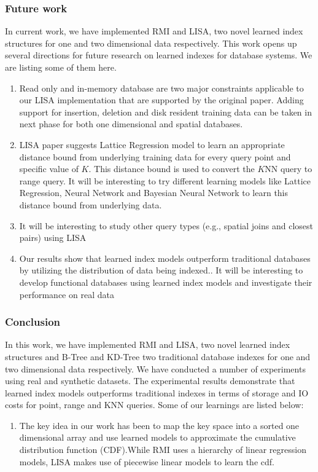 \subsubsection{Future work}

In current work, we have implemented RMI and LISA, two novel learned index structures
for one and two dimensional data respectively. This work opens up several directions for future research on learned indexes for database systems. We are listing some of them here. 

\begin{enumerate}
	\item Read only and in-memory database are two major constraints applicable to our LISA implementation that are supported by the original paper. Adding support for insertion, deletion and disk resident training data can be taken in next phase for both one dimensional and spatial databases.
	\item LISA paper suggests Lattice Regression model to learn an appropriate distance bound from underlying training data for every query point and specific value of $K$. This distance bound is used to convert the $K$NN query to range query. It will be interesting to try different learning models like Lattice Regression, Neural Network and Bayesian Neural Network to learn this distance bound from underlying data. 
	\item It will be interesting to study other query types (e.g., spatial joins and closest pairs) using LISA
	
	\item Our results show that learned index models outperform traditional databases by utilizing the distribution of data being
indexed.. It will be interesting to develop functional databases using learned index models and investigate their performance on real data   
	
\end{enumerate}

\subsubsection{Conclusion}

In this work, we have implemented RMI and LISA, two novel learned index structures and B-Tree and KD-Tree two traditional database indexes for one and two dimensional data respectively. We have conducted a number of experiments using real and synthetic datasets.
The experimental results demonstrate that learned index models outperforms traditional  indexes in terms of storage and IO costs for point, range and KNN queries. Some of our learnings are listed below:

\begin{enumerate}
	\item The key idea in our work has been to map the key space into a sorted one dimensional array and use learned models to approximate the cumulative distribution function (CDF).While RMI uses a hierarchy of linear regression models, LISA makes use of piecewise linear models to learn the cdf. 
	

\end{enumerate}